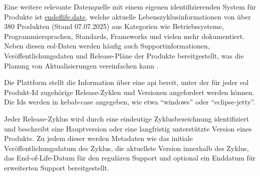Eine weitere relevante Datenquelle mit einem eigenen identifizierenden System für Produkte ist \href{https://endoflife.date}{endoflife.date}, welche aktuelle Lebenszyklusinformationen von über 380 Produkten (Stand 07.07.2025) aus Kategorien wie Betriebssysteme, Programmiersprachen, Standards, Frameworks und vielen mehr dokumentiert.
Neben diesen \acrshort{eol}-Daten werden häufig auch Supportinformationen, Veröffentlichungsdaten und Release-Pläne der Produkte bereitgestellt, was die Planung von Aktualisierungen vereinfachen kann \autocite{EndOfLifeDateHomepage}.

Die Plattform stellt die Information über eine \acrshort{api} bereit, unter der für jeder \acrshort{eol} Produkt-Id zugehörige Release-Zyklen und Versionen angefordert werden können.
Die Ids werden in kebab-case angegeben, wie etwa \enquote{windows} oder \enquote{eclipse-jetty}.

Jeder Release-Zyklus wird durch eine eindeutige Zyklusbezeichnung identifiziert und beschreibt eine Hauptversion oder eine langfristig unterstützte Version eines Produkts.
Zu jedem dieser werden Metadaten wie das initiale Veröffentlichungsdatum des Zyklus, die aktuellste Version innerhalb des Zyklus, das End-of-Life-Datum für den regulären Support und optional ein Enddatum für erweiterten Support bereitgestellt.



